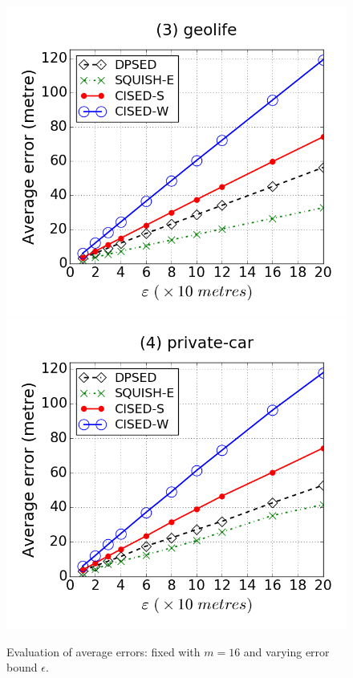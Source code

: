 \begin{figure}[tb]
\includegraphics[scale = 0.240]{figures/Exp-error-epsilon-geolife.png}
\includegraphics[scale = 0.240]{figures/Exp-error-epsilon-private.png}
\vspace{-1ex}
\caption{\small Evaluation of average errors: fixed with $m=16$ and varying error bound $\epsilon$.}
\label{fig:ae-m16}
\vspace{-1ex}
\end{figure}



